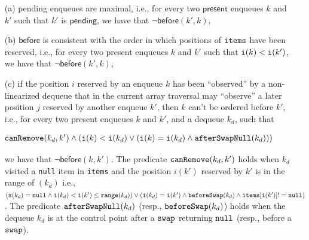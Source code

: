 \begin{itemize}
	\item[(a)] pending enqueues are maximal, i.e., for every two $\mathsf{present}$ enqueues $k$ and $k'$ such that $k'$ is $\mathsf{pending}$, we have that $\neg \mathsf{before}(k',k)$, %
	\item[(b)] $\mathsf{before}$ is consistent with the order in which positions of ${\tt items}$ have been reserved, i.e., for every two present enqueues $k$ and $k'$ such that ${\tt i}(k) < {\tt i}(k')$, we have that $\neg \mathsf{before}(k',k)$, %
	\item[(c)] if the position $i$ reserved by an enqueue $k$ has been ``observed'' by a non-linearized dequeue that in the current array traversal may ``observe'' a later position $j$ reserved by another enqueue $k'$, then $k$ can't be ordered before $k'$, 
	i.e., for every two present enqueues $k$ and $k'$, and a dequeue $k_d$, such that

	\vspace{-2mm}
	\noindent
	{\small
	\begin{align}
	\hspace{-8mm}
	{\tt canRemove}(k_d,k') \land ({\tt i}(k) < {\tt i}(k_d) \lor ({\tt i}(k)={\tt i}(k_d) \land {\tt afterSwapNull}(k_d)))
\label{eq:inst}
	\end{align}}

	\vspace{-6mm}
	\noindent
	we have that $\neg \mathsf{before}(k,k')$. The predicate ${\tt canRemove}(k_d,k')$ holds when $k_d$ visited a {\tt null} item in {\tt items} and the position $i(k')$ reserved by $k'$ is in the range of $(k_d)$ i.e., $({\tt x}(k_d) = {\tt null} \land {\tt i}(k_d) < {\tt i}(k') \leq {\tt range}(k_d)) \lor ({\tt i}(k_d) = {\tt i}(k') \land {\tt beforeSwap}(k_d) \land {\tt items}[{\tt i}(k')] != {\tt null})$. The predicate ${\tt afterSwapNull}(k_d)$ (resp., ${\tt beforeSwap}(k_d)$) holds when the dequeue $k_d$ is at the control point after a ${\tt swap}$ returning ${\tt null}$ (resp., before a ${\tt swap}$).
\vspace{-2mm}
\end{itemize}
